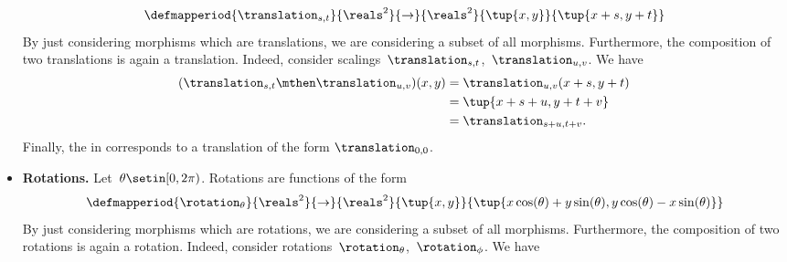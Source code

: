 \begin{solution}
\begin{itemize}
\begin{equation}
                  \defmapperiod{
                      \translation_{s,t}
                  }{
                      \reals^2
                  }{
                      \to
                  }{
                      \reals^2
                  }{
                      \tup{x,y}
                  }{
                      \tup{x+s,y+t}
                  }
              \end{equation}
              By just considering morphisms which are translations, we are considering a subset of all morphisms.
              Furthermore, the composition of two translations is again a translation.
              Indeed, consider scalings~$\translation_{s,t}$,~$\translation_{u,v}$.
              We have
              \begin{equation}
                  \begin{aligned}
                      (\translation_{s,t}\mthen \translation_{u,v})(x,y)
                       & =\translation_{u,v}(x+s, y+t) \\
                       & =\tup{x+s+u, y+t+v} \\
                       & =\translation_{s+u,t+v}.
                  \end{aligned}
              \end{equation}
              Finally, the  in \Draw corresponds to a translation of the form $\translation_{0,0}$.
        \item \textbf{Rotations.}
              Let~$\theta \setin [0,2\pi)$.
              Rotations are functions of the form
              \begin{equation}
                  \defmapperiod{
                      \rotation_{\theta}
                  }{
                      \reals^2
                  }{
                      \to
                  }{
                      \reals^2
                  }{
                      \tup{x,y}
                  }{
                      \tup{x\cos(\theta)+y\sin(\theta), y\cos(\theta)-x\sin(\theta)}
                  }
              \end{equation}
              By just considering morphisms which are rotations, we are considering a subset of all morphisms.
              Furthermore, the composition of two rotations is again a rotation.
              Indeed, consider rotations~$\rotation_{\theta}$,~$\rotation_{\phi}$.
              We have
              \begin{equation}
                  \begin{aligned}

\end{aligned}
\end{equation}
\end{itemize}
\end{solution}
